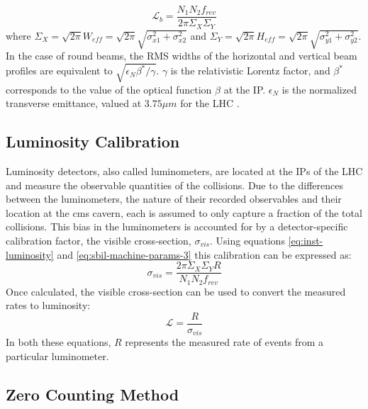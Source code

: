 \begin{equation}
\label{eq:sbil-machine-params-6}
\mathcal{L}_b = \frac{N_1 N_2 f_{rev}}{2 \pi \Sigma_X \Sigma_Y}
\end{equation}
where $\Sigma_X = \sqrt{2\pi} W_{eff} = \sqrt{2\pi} \sqrt{\sigma_{x1}^2 + \sigma_{x2}^2}$ and $\Sigma_Y = \sqrt{2\pi} H_{eff} = \sqrt{2\pi} \sqrt{\sigma_{y1}^2 + \sigma_{y2}^2}$. In the case of round beams, the RMS widths of the horizontal and vertical beam profiles are equivalent to $\sqrt{\epsilon_{N} \beta^{*} / \gamma}$. $\gamma$ is the relativistic Lorentz factor, and $\beta^{*}$ corresponds to the value of the optical function $\beta$ at the IP. $\epsilon_{N}$ is the normalized transverse emittance, valued at $3.75\mu m$ for the LHC \cite{Brüning:782076}.

\subsection{Luminosity Calibration}
\label{subsec:luminosity_calibration}

Luminosity detectors, also called luminometers, are located at the IPs of the LHC and measure the observable quantities of the collisions. Due to the differences between the luminometers, the nature of their recorded observables and their location at the \acrshort{cms} cavern, each is assumed to only capture a fraction of the total collisions. This bias in the luminometers is accounted for by a detector-specific calibration factor, the visible cross-section, $\sigma_{vis}$. Using equations \ref{eq:inst-luminosity} and \ref{eq:sbil-machine-params-3} this calibration can be expressed as:
\begin{equation}
    \label{eq:vis-cross-section}
    \sigma_{vis} = \frac{2 \pi \Sigma_X \Sigma_Y R}{N_1 N_2 f_{rev}}
\end{equation}
Once calculated, the visible cross-section can be used to convert the measured rates to luminosity:
\begin{equation}
    \label{eq:luminosity-from-rates}
    \mathcal{L} = \frac{R}{\sigma_{vis}}
\end{equation}
In both these equations, $R$ represents the measured rate of events from a particular luminometer.

\subsection{Zero Counting Method}
\label{subsec:zero-counting}

